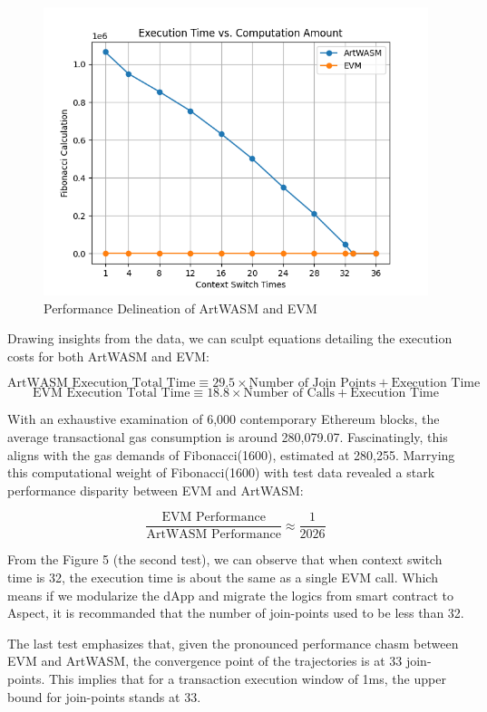 \begin{figure}[htp]
\begin{minipage}{0.3\textwidth}
    \centering
    \includegraphics[width=1\linewidth]{sections/tx-latency-na-vs-jpc.png}
    \caption{Performance Delineation of ArtWASM and EVM}
    \label{fig:image3}
  \end{minipage}
\end{figure}

Drawing insights from the data, we can sculpt equations detailing the execution costs for both ArtWASM and EVM:

\[
\text{ArtWASM Execution Total Time} \equiv 29.5 \times \text{Number of Join Points} + \text{Execution Time}
\]
\[
\text{EVM Execution Total Time} \equiv 18.8 \times \text{Number of Calls} + \text{Execution Time}
\]

With an exhaustive examination of 6,000 contemporary Ethereum blocks, the average transactional gas consumption is around 280,079.07. Fascinatingly, this aligns with the gas demands of Fibonacci(1600), estimated at 280,255. Marrying this computational weight of Fibonacci(1600) with test data revealed a stark performance disparity between EVM and ArtWASM:

\[
  \frac{\text{EVM Performance}}{\text{ArtWASM Performance}} \approx \frac{1}{2026}
\]

From the Figure 5 (the second test), we can observe that when context switch time is 32, the execution time is about the same as a single EVM call. Which means if we modularize the dApp and migrate the logics from smart contract to Aspect, it is recommanded that the number of join-points used to be less than 32.

The last test emphasizes that, given the pronounced performance chasm between EVM and ArtWASM, the convergence point of the trajectories is at 33 join-points. This implies that for a transaction execution window of 1ms, the upper bound for join-points stands at 33.

